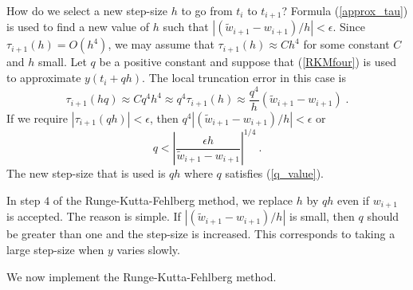 \begin{rmk}
How do we select a new step-size $h$ to go from $t_i$ to $t_{i+1}$?
Formula (\ref{approx_tau}) is used to find a new value of $h$ such
that $\left|(\tilde{w}_{i+1} - w_{i+1})/h\right| < \epsilon$.
Since $\tau_{i+1}(h) = O(h^4)$, we may assume that
$\tau_{i+1}(h)\approx Ch^4$ for some constant $C$ and $h$ small.  Let
$q$ be a positive constant and suppose that (\ref{RKMfour}) is used
to approximate $y(t_i+qh)$.
The local truncation error in this case is
\[
\tau_{i+1}(hq) \approx Cq^4h^4 \approx q^4 \tau_{i+1}(h) \approx
\frac{q^4}{h}\left( \tilde{w}_{i+1} - w_{i+1} \right) \;  .
\]
If we require $|\tau_{i+1}(qh)| < \epsilon$, then
$q^4\left| (\tilde{w}_{i+1} - w_{i+1})/h \right| < \epsilon$ or
\begin{equation} \label{q_value}
q < \left|\frac{\epsilon h}{\tilde{w}_{i+1} - w_{i+1}} \right|^{1/4} \ .
\end{equation}
The new step-size that is used is $qh$ where $q$ satisfies
(\ref{q_value}).
\end{rmk}

\begin{rmk}
In step $4$ of the Runge-Kutta-Fehlberg method, we replace
$h$ by $qh$ even
if $w_{i+1}$ is accepted.  The reason is simple.
If $\left|(\tilde{w}_{i+1}-w_{i+1})/h\right|$ is small, then $q$
should be greater than one and the step-size is increased.  This
corresponds to taking a large step-size when $y$ varies slowly.
\end{rmk}

We now implement the Runge-Kutta-Fehlberg method.

